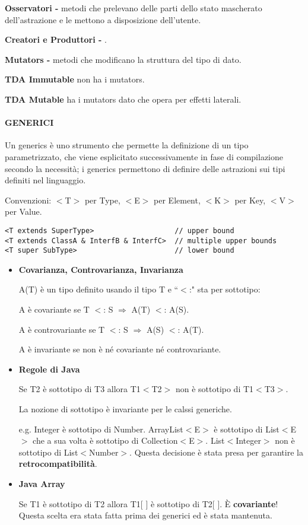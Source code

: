 \documentclass[a4paper, 12pt]{article}
\begin{document}
\textbf{Osservatori -} metodi che prelevano delle parti dello stato mascherato
dell'astrazione e le mettono a disposizione dell'utente.

\textbf{Creatori e Produttori -} .

\textbf{Mutators -} metodi che modificano la struttura del tipo di dato.

\textbf{TDA Immutable} non ha i mutators.

\textbf{TDA Mutable} ha i mutators dato che opera per effetti laterali.

\paragraph{GENERICI}
Un generics è uno strumento che permette la definizione di un tipo parametrizzato, che
viene esplicitato successivamente in fase di compilazione secondo la necessità; i generics
permettono di definire delle astrazioni sui tipi definiti nel linguaggio.

Convenzioni: $<$T$>$ per Type, $<$E$>$ per Element, $<$K$>$ per Key, $<$V$>$ per Value.
\begin{lstlisting}
<T extends SuperType>                   // upper bound
<T extends ClassA & InterfB & InterfC>  // multiple upper bounds
<T super SubType>                       // lower bound
\end{lstlisting}
\begin{itemize}
    \item \textbf{Covarianza, Controvarianza, Invarianza}
    
    A(T) è un tipo definito usando il tipo T e ``$<$:" sta per sottotipo:
    
    A è covariante se T $<$: S $\Rightarrow$ A(T) $<$: A(S).
    
    A è controvariante se T $<$: S $\Rightarrow$ A(S) $<$: A(T).
    
    A è invariante se non è né covariante né controvariante.
    \item \textbf{Regole di Java}
    
    Se T2 è sottotipo di T3 allora T1$<$T2$>$ non è sottotipo di T1$<$T3$>$.
    
    La nozione di sottotipo è invariante per le calssi generiche.
    
    e.g. Integer è sottotipo di Number. ArrayList$<$E$>$ è sottotipo di
    List$<$E$>$ che a sua volta è sottotipo di Collection$<$E$>$. List$<$Integer$>$ non è
    sottotipo di List$<$Number$>$. Questa decisione è stata presa per garantire la
    \textbf{retrocompatibilità}.
    \item \textbf{{Java Array}}
    
    Se T1 è sottotipo di T2 allora T1[ ] è sottotipo di T2[ ]. È \textbf{covariante}!
    Questa scelta era stata fatta prima dei generici ed è stata mantenuta.
\end{itemize}
\end{document}
